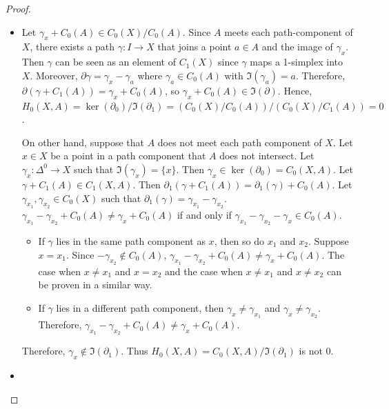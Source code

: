 \documentclass[12pt, psamsfonts]{amsart}
\theoremstyle{definition}
\theoremstyle{remark}
\numberwithin{equation}{section}
\begin{document}
\begin{proof}
  $ $
  \begin{itemize}
    \item
      Let $\gamma_x + C_0(A) \in C_0(X) / C_0(A)$.
      Since $A$ meets each path-component of $X$, there exists a path $\gamma: I \rightarrow X$ that joins a point $a \in A$ and the image of $\gamma_x$.
      Then $\gamma$ can be seen as an element of $C_1(X)$ since $\gamma$ maps a 1-simplex into $X$.
      Moreover, $\partial\gamma = \gamma_x - \gamma_a$ where $\gamma_a \in C_0(A)$ with $\Im(\gamma_a) = a$.
      Therefore, $\partial(\gamma + C_1(A)) = \gamma_x + C_0(A)$, so $\gamma_x + C_0(A) \in \Im(\partial)$.
      Hence, $H_0(X, A) = \ker(\partial_0)/\Im(\partial_1) = (C_0(X)/C_0(A)) / (C_0(X)/C_1(A)) = 0$.

      On other hand, suppose that $A$ does not meet each path component of $X$.
      Let $x \in X$ be a point in a path component that $A$ does not intersect.
      Let $\gamma_x: \Delta^0 \rightarrow X$ such that $\Im(\gamma_x) = \{ x \}$.
      Then $\gamma_x \in \ker(\partial_0) = C_0(X, A)$.
      Let $\gamma + C_1(A) \in C_1(X, A)$.
      Then $\partial_1(\gamma + C_1(A)) = \partial_1(\gamma) + C_0(A)$.
      Let $\gamma_{x_1}, \gamma_{x_2} \in C_0(X)$ such that $\partial_1(\gamma) = \gamma_{x_1} - \gamma_{x_2}$.
      $\gamma_{x_1} - \gamma_{x_2} + C_0(A) \ne \gamma_x + C_0(A)$ if and only if $\gamma_{x_1} - \gamma_{x_2} - \gamma_x \in C_0(A)$.

      \begin{itemize}
        \item
          If $\gamma$ lies in the same path component as $x$, then so do $x_1$ and $x_2$.
          Suppose $x = x_1$.
          Since $-\gamma_{x_2} \notin C_0(A)$, $\gamma_{x_1} - \gamma_{x_2} + C_0(A) \ne \gamma_x + C_0(A)$.
          The case when $x \ne x_1$ and $x = x_2$ and the case when $x \ne x_1$ and $x \ne x_2$ can be proven in a similar way.
        \item
          If $\gamma$ lies in a different path component, then $\gamma_x \ne \gamma_{x_1}$ and $\gamma_x \ne \gamma_{x_2}$.
          Therefore, $\gamma_{x_1} - \gamma_{x_2} + C_0(A) \ne \gamma_x + C_0(A)$.
      \end{itemize}
      Therefore, $\gamma_x \notin \Im(\partial_1)$.
      Thus $H_0(X, A) = C_0(X, A) / \Im(\partial_1)$ is not 0.
    \item
  \end{itemize}
\end{proof}
\end{document}
